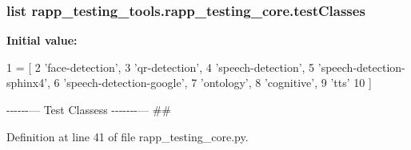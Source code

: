 \hypertarget{namespacerapp__testing__tools_1_1rapp__testing__core_a53a024ad94a0099489d4e453052170b7}{
\subsubsection[{test\-Classes}]{\setlength{\rightskip}{0pt plus 5cm}list rapp\-\_\-testing\-\_\-tools.\-rapp\-\_\-testing\-\_\-core.\-test\-Classes}}\label{namespacerapp__testing__tools_1_1rapp__testing__core_a53a024ad94a0099489d4e453052170b7}
{\bfseries Initial value\-:}
\begin{DoxyCode}
1 = [
2     \textcolor{stringliteral}{'face-detection'},
3     \textcolor{stringliteral}{'qr-detection'},
4     \textcolor{stringliteral}{'speech-detection'},
5     \textcolor{stringliteral}{'speech-detection-sphinx4'},
6     \textcolor{stringliteral}{'speech-detection-google'},
7     \textcolor{stringliteral}{'ontology'},
8     \textcolor{stringliteral}{'cognitive'},
9     \textcolor{stringliteral}{'tts'}
10 ]
\end{DoxyCode}


-\/-\/-\/-\/-\/-\/--- Test Classess -\/-\/-\/-\/-\/-\/-\/--- \#\# 



Definition at line 41 of file rapp\-\_\-testing\-\_\-core.\-py.

